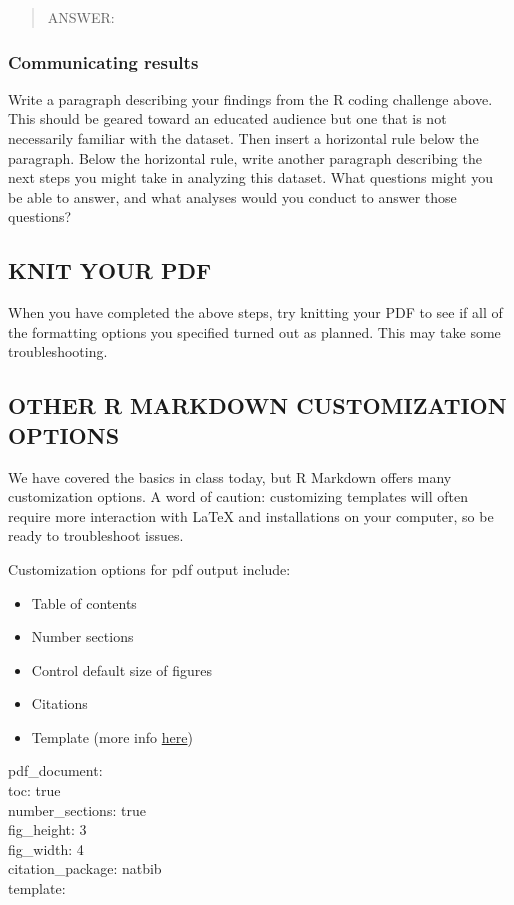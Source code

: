 \documentclass[]{article}
\providecommand{\tightlist}{%
  \setlength{\itemsep}{0pt}\setlength{\parskip}{0pt}}
\begin{document}
\begin{quote}
ANSWER:
\end{quote}

\subsubsection{Communicating results}\label{communicating-results}

Write a paragraph describing your findings from the R coding challenge
above. This should be geared toward an educated audience but one that is
not necessarily familiar with the dataset. Then insert a horizontal rule
below the paragraph. Below the horizontal rule, write another paragraph
describing the next steps you might take in analyzing this dataset. What
questions might you be able to answer, and what analyses would you
conduct to answer those questions?

\subsection{KNIT YOUR PDF}\label{knit-your-pdf}

When you have completed the above steps, try knitting your PDF to see if
all of the formatting options you specified turned out as planned. This
may take some troubleshooting.

\subsection{OTHER R MARKDOWN CUSTOMIZATION
OPTIONS}\label{other-r-markdown-customization-options}

We have covered the basics in class today, but R Markdown offers many
customization options. A word of caution: customizing templates will
often require more interaction with LaTeX and installations on your
computer, so be ready to troubleshoot issues.

Customization options for pdf output include:

\begin{itemize}
\tightlist
\item
  Table of contents
\item
  Number sections
\item
  Control default size of figures
\item
  Citations
\item
  Template (more info
  \href{http://jianghao.wang/post/2017-12-08-rmarkdown-templates/}{here})
\end{itemize}

pdf\_document:\\
toc: true\\
number\_sections: true\\
fig\_height: 3\\
fig\_width: 4\\
citation\_package: natbib\\
template:
\end{document}
